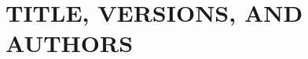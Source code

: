 \documentclass[12pt,english]{article}
\begin{document}


\setcounter{page}{1}

\section*{TITLE, VERSIONS, AND AUTHORS}
\end{document}
